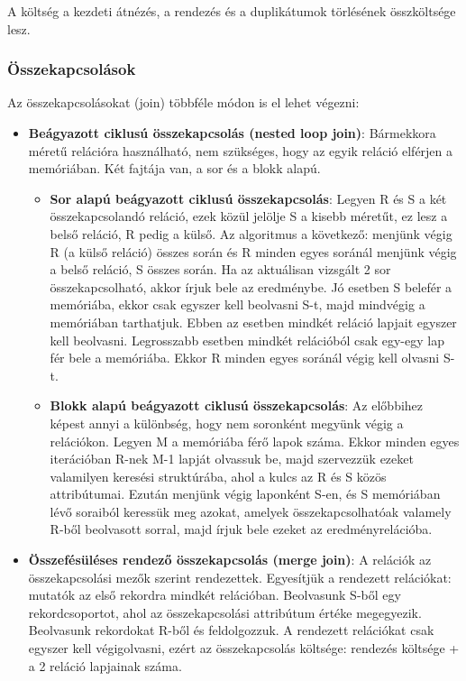 \documentclass[margin=0px]{article}
\begin{document}
	\noindent A költség a kezdeti átnézés, a rendezés és a duplikátumok törlésének összköltsége lesz.
	
	\subsubsection{Összekapcsolások}
	
	Az összekapcsolásokat (join) többféle módon is el lehet végezni:
	
	\begin{itemize}
		\item	\textbf{Beágyazott ciklusú összekapcsolás (nested loop join)}: Bármekkora méretű relációra használható, nem szükséges, hogy
		az egyik reláció elférjen a memóriában. Két fajtája van, a sor és a blokk alapú.
		\begin{itemize}
			\item	\textbf{Sor alapú beágyazott ciklusú összekapcsolás}: Legyen R és S a két összekapcsolandó reláció, ezek közül jelölje
			S a kisebb méretűt, ez lesz a belső reláció, R pedig a külső. Az algoritmus a következő: menjünk végig R (a külső reláció)
			összes során és R minden egyes soránál menjünk végig a belső reláció, S összes során. Ha az aktuálisan vizsgált 2 sor összekapcsolható, akkor írjuk bele az eredménybe. Jó esetben S belefér a memóriába, ekkor csak egyszer kell beolvasni S-t,
			majd mindvégig a memóriában tarthatjuk. Ebben az esetben mindkét reláció lapjait egyszer kell beolvasni. Legrosszabb
			esetben mindkét relációból csak egy-egy lap fér bele a memóriába. Ekkor R minden egyes soránál végig kell olvasni S-t.
			
			\item	\textbf{Blokk alapú beágyazott ciklusú összekapcsolás}: Az előbbihez képest annyi a különbség, hogy nem soronként
			megyünk végig a relációkon. Legyen M a memóriába férő lapok száma. Ekkor minden egyes iterációban R-nek M-1 lapját olvassuk
			be, majd szervezzük ezeket valamilyen keresési struktúrába, ahol a kulcs az R és S közös attribútumai. Ezután menjünk
			végig laponként S-en, és S memóriában lévő soraiból keressük meg azokat, amelyek összekapcsolhatóak valamely R-ből
			beolvasott sorral, majd írjuk bele ezeket az eredményrelációba.
		\end{itemize}
		
		\item	\textbf{Összefésüléses rendező összekapcsolás (merge join)}: A relációk az összekapcsolási mezők szerint rendezettek.
		Egyesítjük a rendezett relációkat: mutatók az első rekordra mindkét relációban. Beolvasunk S-ből egy rekordcsoportot, ahol az összekapcsolási attribútum értéke megegyezik. Beolvasunk rekordokat R-ből és feldolgozzuk. A rendezett relációkat
		csak egyszer kell végigolvasni, ezért az összekapcsolás költsége: rendezés költsége + a 2 reláció lapjainak száma.
		

\end{itemize}
\end{document}
